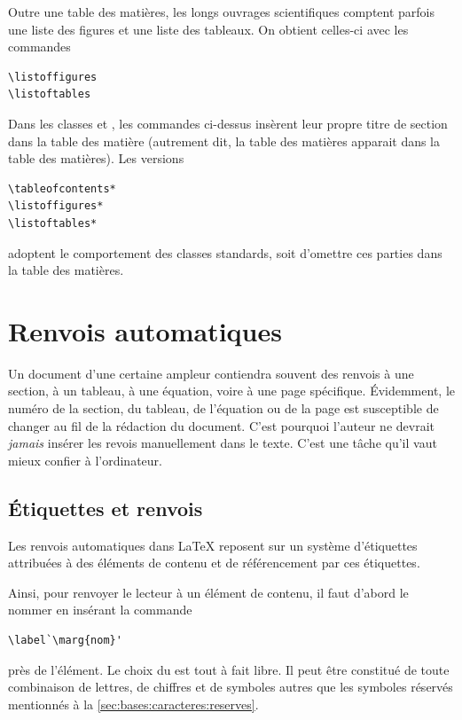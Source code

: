 Outre une table des matières, les longs ouvrages scientifiques
comptent parfois une liste des figures et une liste des tableaux. On
obtient celles-ci avec les commandes
\begin{lstlisting}
\listoffigures
\listoftables
\end{lstlisting}

Dans les classes  et , les commandes
ci-dessus insèrent leur propre titre de section dans la table des
matière (autrement dit, la table des matières apparait dans la table
des matières). Les versions
\begin{lstlisting}
\tableofcontents*
\listoffigures*
\listoftables*
\end{lstlisting}
adoptent le comportement des classes standards, soit d'omettre ces
parties dans la table des matières.


\section{Renvois automatiques}
\label{sec:organisation:renvois}

Un document d'une certaine ampleur contiendra souvent des renvois à
une section, à un tableau, à une équation, voire à une page
spécifique. Évidemment, le numéro de la section, du tableau, de
l'équation ou de la page est susceptible de changer au fil de la
rédaction du document. C'est pourquoi l'auteur ne devrait
\emph{jamais} insérer les revois manuellement dans le texte. C'est une
tâche qu'il vaut mieux confier à l'ordinateur.

\subsection{Étiquettes et renvois}
\label{sec:organisation:renvois:etiquettes}

Les renvois automatiques dans {\LaTeX} reposent sur un système
d'étiquettes attribuées à des éléments de contenu et de référencement
par ces étiquettes.

Ainsi, pour renvoyer le lecteur à un élément de contenu, il faut
d'abord le nommer en insérant la commande
\begin{lstlisting}
\label`\marg{nom}'
\end{lstlisting}
près de l'élément. Le choix du  est tout à fait libre. Il
peut être constitué de toute combinaison de lettres, de chiffres et de
symboles autres que les symboles réservés mentionnés à la
\autoref{sec:bases:caracteres:reserves}.

